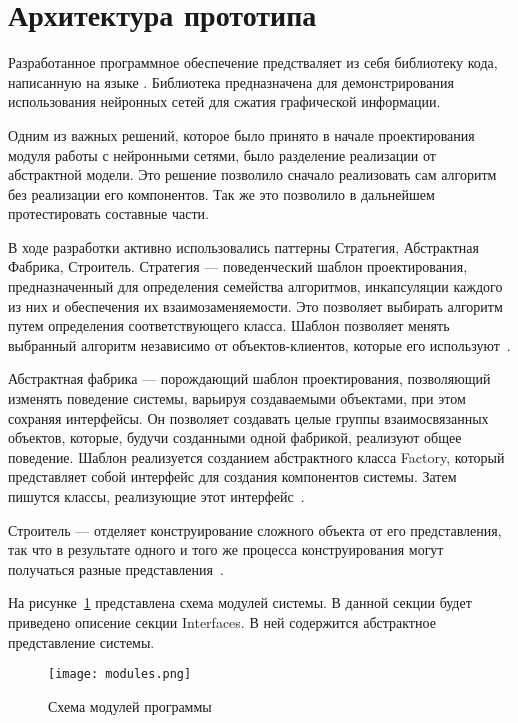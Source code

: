\section{Архитектура прототипа}
\label{sec:development}

Разработанное программное обеспечение предстваляет из себя библиотеку кода,
написанную на языке \csharp{}. Библиотека предназначена для демонстрирования
использования нейронных сетей для сжатия графической информации.

Одним из важных решений, которое было принято в начале проектирования модуля работы
с нейронными сетями, было разделение реализации от абстрактной модели. Это решение
позволило сначало реализовать сам алгоритм без реализации его компонентов. Так же это позволило в дальнейшем протестировать составные части.

В ходе разработки активно использовались паттерны Стратегия, Абстрактная Фабрика, Строитель.
Стратегия --- поведенческий шаблон проектирования, предназначенный для определения семейства алгоритмов,
инкапсуляции каждого из них и обеспечения их взаимозаменяемости. Это позволяет выбирать алгоритм путем
определения соответствующего класса. Шаблон позволяет менять выбранный алгоритм независимо от объектов-клиентов, которые его используют~\cite{development_patterns}.

Абстрактная фабрика --- порождающий шаблон проектирования, позволяющий изменять поведение системы,
варьируя создаваемыми объектами, при этом сохраняя интерфейсы. Он позволяет создавать целые группы
взаимосвязанных объектов, которые, будучи созданными одной фабрикой, реализуют общее поведение.
Шаблон реализуется созданием абстрактного класса Factory, который представляет собой интерфейс для
создания компонентов системы. Затем пишутся классы, реализующие этот интерфейс~\cite{development_patterns}.

Строитель --- отделяет конструирование сложного объекта от его представления,
так что в результате одного и того же процесса конструирования могут получаться разные представления~\cite{development_patterns}.

На рисунке~\ref{fig:modules} представлена схема модулей системы.
В данной секции будет приведено описение секции Interfaces. В ней содержится абстрактное представление
системы.

\begin{figure}[ht]
\centering
  \texttt{[image: modules.png]}
  \caption{ Схема модулей программы }
  \label{fig:modules}
\end{figure}

